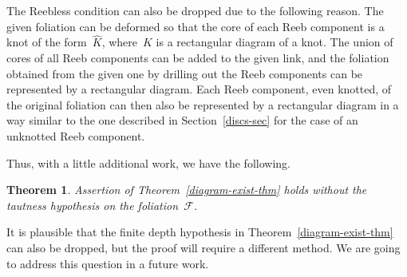 \documentclass{amsart}
\theoremstyle{theorem}
\newtheorem{theo}{Theorem}[section]
\theoremstyle{remark}
\theoremstyle{definition}
\numberwithin{equation}{section}
\numberwithin{figure}{section}
\begin{document}
The Reebless condition can also be dropped due to the following reason. The given foliation
can be deformed so that the core of each Reeb component is a knot of the form~$\widehat K$,
where~$K$ is a rectangular diagram of a knot. The union of cores of all Reeb components
can be added to the given link, and the foliation obtained from the given one
by drilling out the Reeb components can be represented by a rectangular diagram.
Each Reeb component, even knotted, of the original foliation can then also be represented
by a rectangular diagram in a way similar to the one described in Section~\ref{discs-sec}
for the case of an unknotted Reeb component.

Thus, with a little additional work, we have the following.

\begin{theo}
Assertion of Theorem~\ref{diagram-exist-thm} holds without the tautness hypothesis on the foliation~$\mathscr F$.
\end{theo}

It is plausible that the finite depth hypothesis in Theorem~\ref{diagram-exist-thm} can also be dropped, but
the proof will require a different method. We are going to address this question in a future work.
\end{document}
